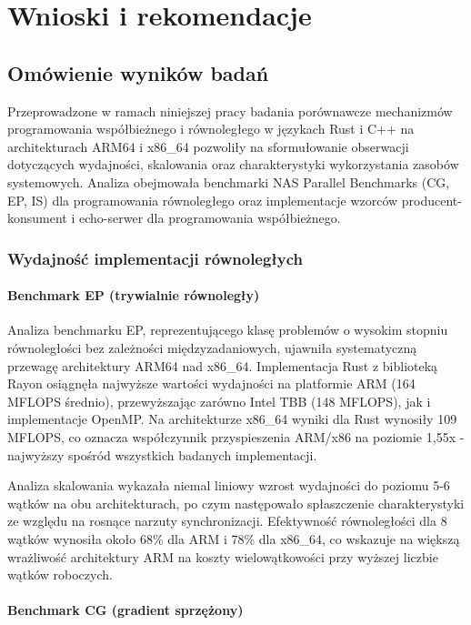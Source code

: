 \chapter{Wnioski i rekomendacje}

\section{Omówienie wyników badań}
Przeprowadzone w ramach niniejszej pracy badania porównawcze mechanizmów programowania współbieżnego i równoległego w językach Rust i C++ na architekturach ARM64 i x86\_64 pozwoliły na sformułowanie obserwacji dotyczących wydajności, skalowania oraz charakterystyki wykorzystania zasobów systemowych. Analiza obejmowała benchmarki {NAS} {Parallel} {Benchmarks} (CG, EP, IS) dla programowania równoległego oraz implementacje wzorców producent-konsument i echo-serwer dla programowania współbieżnego.

\subsection{Wydajność implementacji równoległych}

\subsubsection{Benchmark EP (trywialnie równoległy)}

Analiza benchmarku EP, reprezentującego klasę problemów o wysokim stopniu równoległości bez zależności międzyzadaniowych, ujawniła systematyczną przewagę architektury ARM64 nad x86\_64. Implementacja Rust z biblioteką Rayon osiągnęła najwyższe wartości wydajności na platformie ARM (164 MFLOPS średnio), przewyższając zarówno Intel TBB (148 MFLOPS), jak i implementacje OpenMP. Na architekturze x86\_64 wyniki dla Rust wynosiły 109 MFLOPS, co oznacza współczynnik przyspieszenia ARM/x86 na poziomie 1,55x - najwyższy spośród wszystkich badanych implementacji.

Analiza skalowania wykazała niemal liniowy wzrost wydajności do poziomu 5-6 wątków na obu architekturach, po czym następowało spłaszczenie charakterystyki ze względu na rosnące narzuty synchronizacji. Efektywność równoległości dla 8 wątków wynosiła około 68\% dla ARM i 78\% dla x86\_64, co wskazuje na większą wrażliwość architektury ARM na koszty wielowątkowości przy wyższej liczbie wątków roboczych.

\subsubsection{Benchmark CG (gradient sprzężony)}

